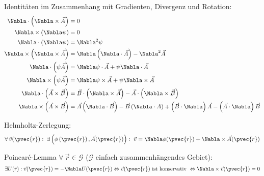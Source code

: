 \documentclass[11pt]{article}
\numberwithin{equation}{section}
\begin{document}
        Identitäten im Zusammenhang mit Gradienten, Divergenz und Rotation:
    		\begin{equation}
          \begin{aligned}
            \Nabla\cdot\left(\Nabla\times\vec{A}\right) &= 0 \\
            \Nabla\times\left(\Nabla\psi\right) &= 0 \\
            \Nabla\cdot\left(\Nabla\psi\right) &= \Nabla^2\psi \\
            \Nabla\times\left(\Nabla\times\vec{A}\right) &= \Nabla\left(\Nabla\cdot\vec{A}\right) -\Nabla^2\vec{A} \\
            \Nabla\cdot\left(\psi\vec{A}\right) &= \Nabla\psi\cdot\vec{A} + \psi\Nabla\cdot\vec{A}\\
            \Nabla\times\left(\psi\vec{A}\right) &= \Nabla\psi\times\vec{A} + \psi\Nabla\times\vec{A} \\
            \Nabla\cdot\left(\vec{A}\times\vec{B}\right) &= \vec{B}\cdot\left(\Nabla\times\vec{A}\right) - \vec{A}\cdot\left(\Nabla\times\vec{B}\right) \\
            \Nabla\times\left(\vec{A}\times\vec{B}\right) &= \vec{A}\left(\Nabla\cdot\vec{B}\right) - \vec{B}\left(\Nabla\cdot{A}\right) + \left(\vec{B}\cdot\Nabla\right)\vec{A} - \left(\vec{A}\cdot\Nabla\right)\vec{B} \\
          \end{aligned}
    		\end{equation}

        Helmholtz-Zerlegung:
    		\begin{equation}
          \forall \,\vec{v}(\pvec{r}):\; \exists\left(\phi\left(\pvec{r}\right),\vec{A}(\pvec{r})\right):\;\vec{v} = \Nabla\phi(\pvec{r}) + \Nabla\times\vec{A}(\pvec{r})
    		\end{equation}

        Poincaré-Lemma $\forall\, \vec{r}\in\mathcal{G}$ ($\mathcal{G}$ einfach zusammenhängendes Gebiet):
        \begin{equation}
          \exists U(\vec{r}): \vec{v}(\pvec{r}) = -\Nabla U(\pvec{r})
          \Leftrightarrow \vec{v}(\pvec{r}) \text{ ist konservativ }
          \Leftrightarrow \Nabla\times\vec{v}(\pvec{r}) = 0
        \end{equation}
\end{document}
